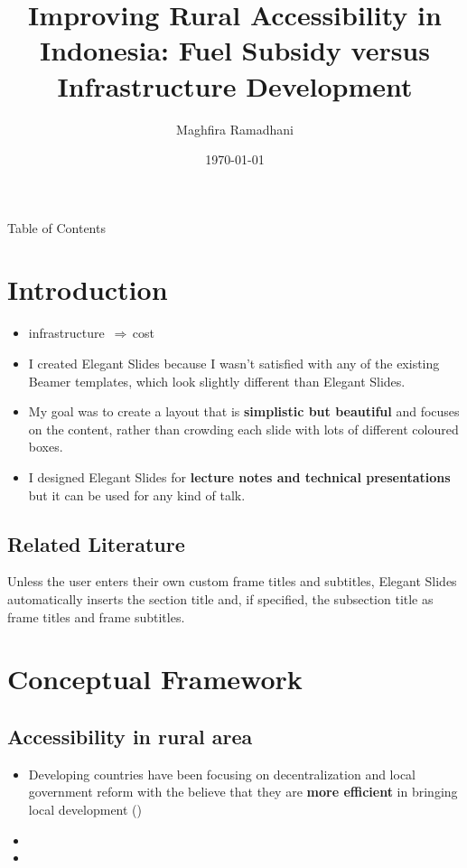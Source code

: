 \documentclass[
11pt,notheorems,hyperref={pdfauthor=Maghfira Ramadhani}
]{beamer}
\title[
]{Improving Rural Accessibility in Indonesia: Fuel Subsidy versus Infrastructure Development}
\author[
]{
    Maghfira Ramadhani 
}
\institute{
    School of Economics, \\
    Georgia Institute of Technology}
\date{\today}
\def\up{\textuparrow\,}
\def\so{{$\Rightarrow\,$}}
\newcommand{\al}[1]{\textbf{\alert{#1}}}
\begin{document}
{
\begin{frame}
  \titlepage
\end{frame}
}
\addtocounter{framenumber}{-1}

\begin{frame}{Table of Contents}
    \tableofcontents%
\end{frame}


\section{Introduction}
\begin{frame}
\begin{itemize}
    \item infrastructure \up \so cost \up \citeauthor{hartojo_2022}
    \item I created Elegant Slides because I wasn't satisfied with any of the existing Beamer templates, which look slightly different than Elegant Slides.
    \item My goal was to create a layout that is \al{simplistic but beautiful} and focuses on the content, rather than crowding each slide with lots of different coloured boxes.
    \item I designed Elegant Slides for \al{lecture notes and technical presentations} but it can be used for any kind of talk. 
\end{itemize}
\end{frame}

\subsection{Related Literature}
\begin{frame}
    Unless the user enters their own custom frame titles and subtitles, Elegant Slides automatically inserts the section title and, if specified, the subsection title as frame titles and frame subtitles.
\end{frame}

\section{Conceptual Framework}
\subsection{Accessibility in rural area}
\begin{frame}
\begin{itemize}
    \item Developing countries have been focusing on decentralization and local government reform with the believe that they are \alert{\textbf{more efficient}} in bringing local development (\cite{vazquez_2017}) 
    \item 
    \item 
\end{itemize}
\end{frame}
\end{document}

